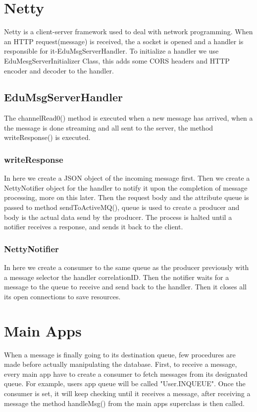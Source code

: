 \documentclass{article}
\begin{document}
\section{Netty}
Netty is a client-server framework used to deal with network programming. When an HTTP request(message) is received, the a socket is opened and a handler is responsible for it-EduMsgServerHandler. To initialize a handler we use EduMesgServerInitializer Class, this adds some CORS headers and HTTP encoder and decoder to the handler.

\subsection{EduMsgServerHandler}
The channelRead0() method is executed when a new message has arrived, when a the message is done streaming and all sent to the server, the method writeResponse() is executed.

\subsubsection{writeResponse}
In here we create a JSON object of the incoming message first. Then we create a NettyNotifier object for the handler to notify it upon the completion of message processing, more on this later. Then the request body and the attribute queue is passed to method sendToActiveMQ(),  queue is used to  create a producer and body is the actual data send by the producer. The process is halted until a notifier receives a response, and sends it back to the client.

\subsubsection{NettyNotifier}
In here we create a consumer to the same queue as the producer previously with a message selector the handler correlationID. Then the notifier waits for a message to the queue to receive and send back to the handler. Then it closes all its open connections to save resources.


\section{Main Apps}
When a message is finally going to its destination queue, few procedures are made before actually manipulating the database. First, to receive a message, every main app have to create a consumer to fetch messages from its designated queue. For example, users app queue will be called "User.INQUEUE". Once the consumer is set, it will keep checking until it receives a message, after receiving a message the method handleMsg() from the main apps superclass is then called.
\end{document}
